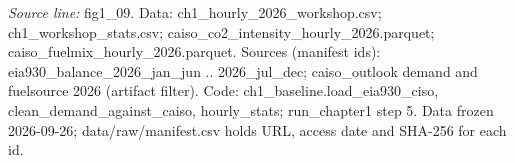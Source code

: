 {\scriptsize\textit{Source line:} fig1\_\allowbreak{}09. Data: ch1\_\allowbreak{}hourly\_\allowbreak{}2026\_\allowbreak{}workshop.csv; ch1\_\allowbreak{}workshop\_\allowbreak{}stats.csv; caiso\_\allowbreak{}co2\_\allowbreak{}intensity\_\allowbreak{}hourly\_\allowbreak{}2026.parquet; caiso\_\allowbreak{}fuelmix\_\allowbreak{}hourly\_\allowbreak{}2026.parquet. Sources (manifest ids): eia930\_\allowbreak{}balance\_\allowbreak{}2026\_\allowbreak{}jan\_\allowbreak{}jun .. 2026\_\allowbreak{}jul\_\allowbreak{}dec; caiso\_\allowbreak{}outlook demand and fuelsource 2026 (artifact filter). Code: ch1\_\allowbreak{}baseline.load\_\allowbreak{}eia930\_\allowbreak{}ciso, clean\_\allowbreak{}demand\_\allowbreak{}against\_\allowbreak{}caiso, hourly\_\allowbreak{}stats; run\_\allowbreak{}chapter1 step 5. Data frozen 2026-09-26; data/raw/manifest.csv holds URL, access date and SHA-256 for each id.}